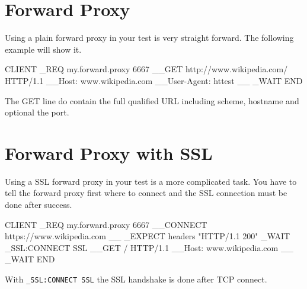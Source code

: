 \section{Forward Proxy}

Using a plain forward proxy in your test is very straight forward. The following
example will show it.
\begin{usplisting}
    CLIENT
      _REQ my.forward.proxy 6667
      __GET http://www.wikipedia.com/ HTTP/1.1
      __Host: www.wikipedia.com
      __User-Agent: httest
      __
      _WAIT
    END
\end{usplisting}

The GET line do contain the full qualified URL including scheme, hostname and 
optional the port.

\section{Forward Proxy with SSL}

Using a SSL forward proxy in your test is a more complicated task. You have to
tell the forward proxy first where to connect and the SSL connection must be
done after success.
\begin{usplisting}
    CLIENT
    _REQ my.forward.proxy 6667
    __CONNECT https://www.wikipedia.com
    __
    _EXPECT headers "HTTP/1.1 200"
    _WAIT
    _SSL:CONNECT SSL
    __GET / HTTP/1.1
    __Host: www.wikipedia.com
    __
    _WAIT
    END
\end{usplisting}

With \texttt{\_SSL:CONNECT SSL} the SSL handshake is done after TCP connect.
